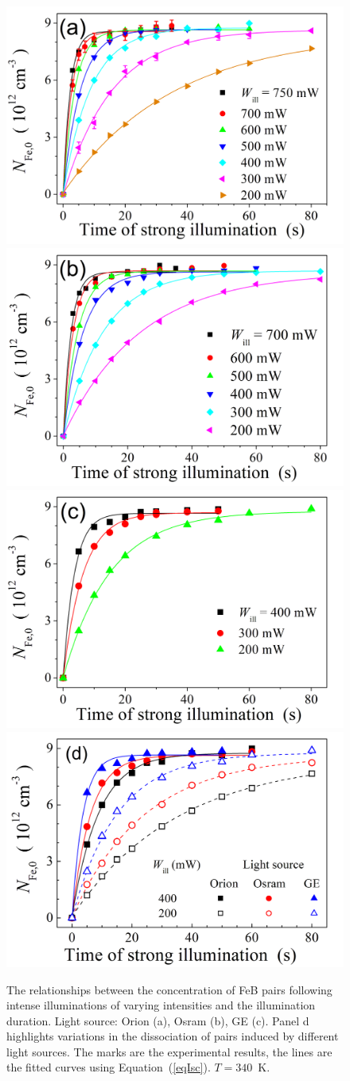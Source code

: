 \documentclass{WileyMSP-template}
\begin{document}
\begin{figure}
\centering
  \includegraphics[width=0.4\linewidth]{Fig3a.png}
  \includegraphics[width=0.4\linewidth]{Fig3b.png}
  \includegraphics[width=0.4\linewidth]{Fig3c.png}
  \includegraphics[width=0.4\linewidth]{Fig3d.png}
  \caption{The relationships between the concentration of FeB pairs following intense illuminations of varying intensities and the illumination duration.
  Light source: Orion (a), Osram (b), GE (c).
  Panel d highlights variations in the dissociation of pairs induced by different light sources.
  The marks are the experimental results, the lines are the fitted curves using Equation~(\ref{eqIsc}).
  $T=340$~K.}
  \label{fig3}
\end{figure}
\end{document}
